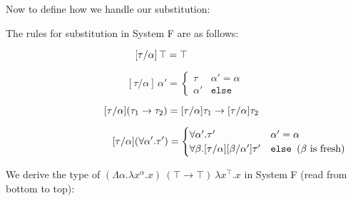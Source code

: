 \newpage

\noindent
Now to define how we handle our substitution:

\begin{Def}

    The rules for substitution in System F are as follows:
   
    \[  \hspace{-4.8em}
[\tau/\alpha]\, \top = \top
\]

\[
[\tau/\alpha]\, \alpha' =
\begin{cases}
    \tau     & \alpha' = \alpha \\
    \alpha'  & \texttt{else}
\end{cases}
\]

\[
\hspace{-.8em}
[\tau/\alpha](\tau_1 \to \tau_2) = [\tau/\alpha]\tau_1 \to [\tau/\alpha]\tau_2
\]

\[
\hspace{8.8em}
[\tau/\alpha](\forall \alpha' . \tau') =
\begin{cases}
    \forall \alpha' . \tau' & \alpha' = \alpha \\
    \forall \beta . [\tau/\alpha][\beta/\alpha']\tau' & \texttt{else } (\beta \text{ is fresh})
\end{cases}
\]
\end{Def}
    
\begin{Example}

    \label{ex:system-f-typing}
    We derive the type of
    $(\Lambda \alpha . \lambda x^\alpha . x)\ (\top \to \top)\ \lambda x^\top . x
    $ in System F (read from bottom to top):
    
    \vspace{2em}
    
    \end{Example}
    \newpage 

